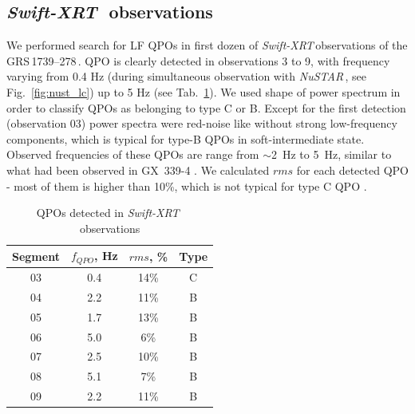 \documentclass[a4paper,fleqn,usenatbib]{mnras}
\def\grs{{GRS\,1739--278\,}}
\def\swiftx{{\em Swift-XRT\,}}
\def\nustar{{\em NuSTAR\,}}
\begin{document}
\subsection{\swiftx\, observations}
We performed search for LF QPOs in first dozen of \swiftx observations of the \grs. 
QPO is clearly detected in observations 3 to 9, with frequency varying from 0.4 Hz (during simultaneous observation with \nustar, see Fig.~\ref{fig:nust_lc}) up to 5 Hz (see Tab.~\ref{tab:xrtqpo}).
We used shape of power spectrum in order to classify QPOs as belonging to type C or B. Except for the first detection (observation 03) power spectra were red-noise like without strong low-frequency components, which is typical for type-B QPOs in soft-intermediate state. Observed frequencies of these QPOs are range from $\sim$2~Hz to 5~Hz, similar to what had been observed in GX~339-4 \citep{motta11}. We calculated $rms$ for each detected QPO - most of them is higher than 10\%, which is not typical for type C QPO \citep{casella05}.

\begin{table}
\noindent
\centering
\caption{QPOs detected in \swiftx\, observations}
\label{tab:xrtqpo}
\centering
\begin{tabular}{|c|c|c|c|}
\hline\hline
Segment & $f_{QPO}$, Hz & $rms$, \% & Type\\
\hline
03  &  0.4  &  14\% & C\\
04  &  2.2 &  11\% & B\\
05  &  1.7  & 13\% & B \\ 
06  &  5.0 &   6\% & B\\
07  &  2.5 &  10\% &  B\\ 
08  &  5.1 &   7\% & B\\
09  &  2.2 &  11\% &  B\\
\hline
\end{tabular}
\end{table}
\end{document}
